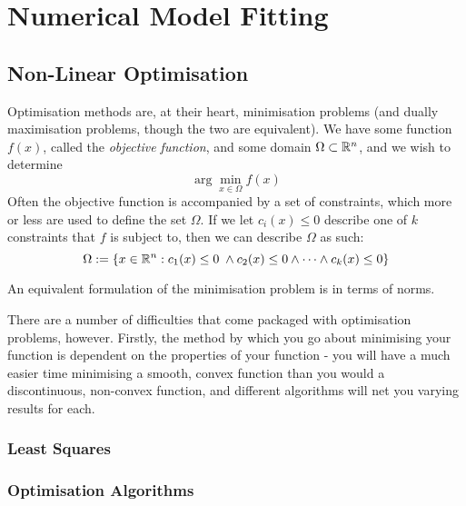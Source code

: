 
\chapter{Numerical Model Fitting}
\label{chapter4}

\section{Non-Linear Optimisation}

Optimisation methods are, at their heart, minimisation problems (and dually maximisation problems, 
though the two are equivalent). We have some function $f(x)$, called the \textit{objective function},
and some domain $\Omega \subset \mathbb{R}^n$, and we wish to determine
$$\arg\min_{x \in \Omega} f(x)$$
Often the objective function is accompanied by a set of constraints, which more or 
less are used to define the set $\Omega$. If we let $c_i(x) \le 0$ describe one of $k$ constraints that $f$ 
is subject to, then we can describe $\Omega$ as such:
$$\Omega := \lbrace x \in \mathbb{R}^n : c_1(x) \le 0 \; \land c_2(x) \le 0 \land \dots \land c_k(x) \le 0 \rbrace$$

An equivalent formulation of the minimisation problem is in terms of norms. 

There are a number of difficulties that come packaged with optimisation problems, however. Firstly, 
the method by which you go about minimising your function is dependent on the properties of your function 
- you will have a much easier time minimising a smooth, convex function than you would a discontinuous, 
non-convex function, and different algorithms will net you varying results for each. 


\subsection{Least Squares}



\subsection{Optimisation Algorithms}

